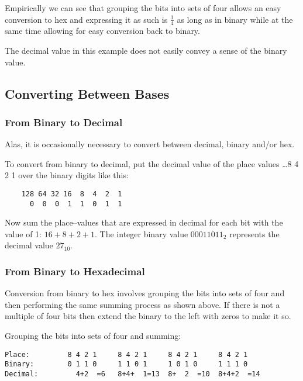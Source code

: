 Empirically we can see that grouping the bits into sets of four
allows an easy conversion to hex and expressing it as such is
$\frac{1}{4}$ as long as in binary while at the same time
allowing for easy conversion back to binary.

The decimal value in this example does not easily convey a sense
of the binary value.

\subsection{Converting Between Bases}

\subsubsection{From Binary to Decimal}
\label{section:bindec}

Alas, it is occasionally necessary to convert between decimal,
binary and/or hex.

To convert from binary to decimal, put the decimal value of the place values 
{\ldots8 4 2 1} over the binary digits like this:

\begin{verbatim}
    128 64 32 16  8  4  2  1
      0  0  0  1  1  0  1  1
\end{verbatim}

Now sum the place--values that are expressed in decimal for each 
bit with the value of 1: $16+8+2+1$.  The integer binary value
$00011011_2$ represents the decimal value $27_{10}$.

\subsubsection{From Binary to Hexadecimal}
\label{section:binhex}

Conversion from binary to hex involves grouping the bits into
sets of four and then performing the same summing process as 
shown above.  If there is not a multiple of four bits then
extend the binary to the left with zeros to make it so.

Grouping the bits into sets of four and summing:

\begin{verbatim}
Place:         8 4 2 1     8 4 2 1     8 4 2 1     8 4 2 1
Binary:        0 1 1 0     1 1 0 1     1 0 1 0     1 1 1 0
Decimal:         4+2  =6   8+4+  1=13  8+  2  =10  8+4+2  =14
\end{verbatim}

